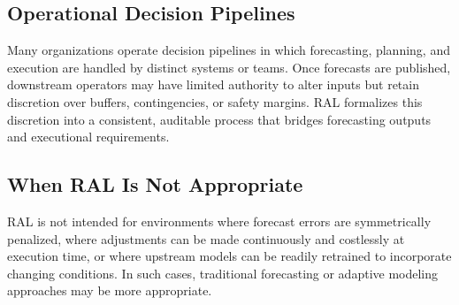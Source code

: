 \subsection{Operational Decision Pipelines}

Many organizations operate decision pipelines in which forecasting, planning, and
execution are handled by distinct systems or teams. Once forecasts are published,
downstream operators may have limited authority to alter inputs but retain
discretion over buffers, contingencies, or safety margins. RAL formalizes this
discretion into a consistent, auditable process that bridges forecasting outputs
and executional requirements.

\subsection{When RAL Is Not Appropriate}

RAL is not intended for environments where forecast errors are symmetrically
penalized, where adjustments can be made continuously and costlessly at execution
time, or where upstream models can be readily retrained to incorporate changing
conditions. In such cases, traditional forecasting or adaptive modeling
approaches may be more appropriate.
